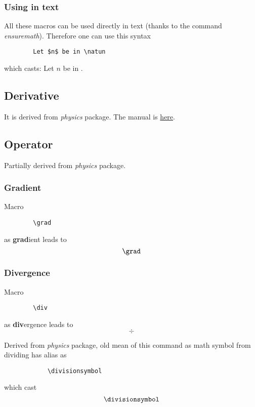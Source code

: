 \documentclass{article}
\begin{document}
		\subsubsection*{Using in text}
		All these macros can be used directly in text (thanks to the command \textit{ensuremath}). Therefore one can use this syntax
		\begin{lstlisting}
		Let $n$ be in \natun
		\end{lstlisting}
		which casts: Let $n$ be in \natun.
		
	\subsection*{Derivative}
		It is derived from \textit{physics} package. The manual is \href{http://mirrors.ctan.org/macros/latex/contrib/physics/physics.pdf}{here}.
		
	\subsection*{Operator}
	Partially derived from \textit{physics} package.
	
		\subsubsection*{Gradient}
		Macro
		\begin{lstlisting}
		\grad
		\end{lstlisting}
		as \textbf{grad}ient leads to
		\begin{equation*}
			\grad
		\end{equation*}
	
		\subsubsection*{Divergence}
		Macro
		\begin{lstlisting}
		\div
		\end{lstlisting}
		as \textbf{div}ergence leads to
		\begin{equation*}
			\div
		\end{equation*}
	
		Derived from \textit{physics} package, old mean of this command as math symbol from dividing has alias as
		\begin{lstlisting}
			\divisionsymbol
		\end{lstlisting}
		which cast
		\begin{equation*}
			\divisionsymbol
		\end{equation*}
	
\end{document}
